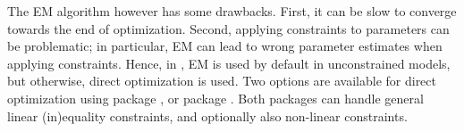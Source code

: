\documentclass[article]{jss}
\newcommand{\mat}{\mathbf}
\newcommand{\greekv}[1]{\mbox{\boldmath$\mathrm{#1}$}}
\begin{document}




The EM algorithm however has some drawbacks.  First, it can be slow to
converge towards the end of optimization.  Second, applying
constraints to parameters can be problematic; in particular, EM can
lead to wrong parameter estimates when applying constraints.  Hence,
in , EM is used by default in unconstrained models, but
otherwise, direct optimization is used.  Two options are available for
direct optimization using package 
\citep{Tamura2009,Spellucci2002}, or package .  Both
packages can handle general linear (in)equality constraints, and
optionally also non-linear constraints.

\end{document}
